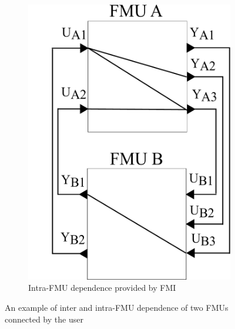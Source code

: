 \begin{figure}[htb]
\begin{subfigure}{.5\textwidth}
  \includegraphics[scale=0.2]{figures/Two_Models}
  \caption{Intra-FMU dependence provided by FMI}
  \label{fig:2mdlsintra}
\end{subfigure}
\caption{An example of inter and intra-FMU dependence of two FMUs connected by the user}
\label{fig:2mdls}
\end{figure}

